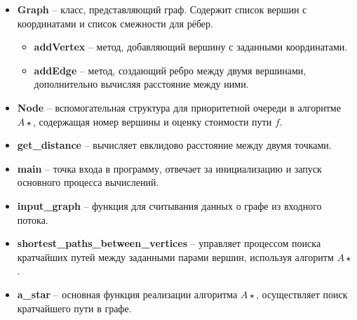 \documentclass[12pt]{article}
\begin{document}
\begin{itemize}
    \item \textbf{Graph} – класс, представляющий граф. Содержит список вершин с координатами и список смежности для рёбер.
    \begin{itemize}
        \item \textbf{addVertex} – метод, добавляющий вершину с заданными координатами.
        \item \textbf{addEdge} – метод, создающий ребро между двумя вершинами, дополнительно вычисляя расстояние между ними.
    \end{itemize}

    \item \textbf{Node} – вспомогательная структура для приоритетной очереди в алгоритме $A\star$, содержащая номер вершины и оценку стоимости пути $f$.

    \item \textbf{get\_distance} – вычисляет евклидово расстояние между двумя точками.

    \item \textbf{main} – точка входа в программу, отвечает за инициализацию и запуск основного процесса вычислений.
    \item \textbf{input\_graph} – функция для считывания данных о графе из входного потока.
    \item \textbf{shortest\_paths\_between\_vertices} – управляет процессом поиска кратчайших путей между заданными парами вершин, используя алгоритм $A\star$.
    \item \textbf{a\_star} – основная функция реализации алгоритма $A\star$, осуществляет поиск кратчайшего пути в графе.
\end{itemize}
\end{document}
